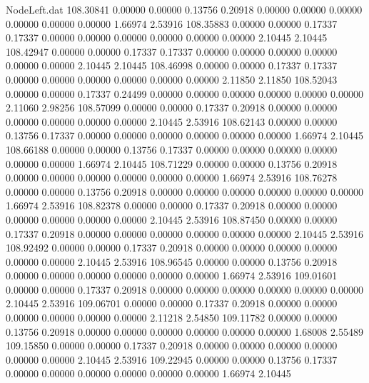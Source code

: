 \begin{filecontents}{NodeLeft.dat}
 108.30841    0.00000    0.00000     0.13756    0.20918    0.00000    0.00000    0.00000    0.00000    0.00000    0.00000    1.66974    2.53916
 108.35883    0.00000    0.00000     0.17337    0.17337    0.00000    0.00000    0.00000    0.00000    0.00000    0.00000    2.10445    2.10445
 108.42947    0.00000    0.00000     0.17337    0.17337    0.00000    0.00000    0.00000    0.00000    0.00000    0.00000    2.10445    2.10445
 108.46998    0.00000    0.00000     0.17337    0.17337    0.00000    0.00000    0.00000    0.00000    0.00000    0.00000    2.11850    2.11850
 108.52043    0.00000    0.00000     0.17337    0.24499    0.00000    0.00000    0.00000    0.00000    0.00000    0.00000    2.11060    2.98256
 108.57099    0.00000    0.00000     0.17337    0.20918    0.00000    0.00000    0.00000    0.00000    0.00000    0.00000    2.10445    2.53916
 108.62143    0.00000    0.00000     0.13756    0.17337    0.00000    0.00000    0.00000    0.00000    0.00000    0.00000    1.66974    2.10445
 108.66188    0.00000    0.00000     0.13756    0.17337    0.00000    0.00000    0.00000    0.00000    0.00000    0.00000    1.66974    2.10445
 108.71229    0.00000    0.00000     0.13756    0.20918    0.00000    0.00000    0.00000    0.00000    0.00000    0.00000    1.66974    2.53916
 108.76278    0.00000    0.00000     0.13756    0.20918    0.00000    0.00000    0.00000    0.00000    0.00000    0.00000    1.66974    2.53916
 108.82378    0.00000    0.00000     0.17337    0.20918    0.00000    0.00000    0.00000    0.00000    0.00000    0.00000    2.10445    2.53916
 108.87450    0.00000    0.00000     0.17337    0.20918    0.00000    0.00000    0.00000    0.00000    0.00000    0.00000    2.10445    2.53916
 108.92492    0.00000    0.00000     0.17337    0.20918    0.00000    0.00000    0.00000    0.00000    0.00000    0.00000    2.10445    2.53916
 108.96545    0.00000    0.00000     0.13756    0.20918    0.00000    0.00000    0.00000    0.00000    0.00000    0.00000    1.66974    2.53916
 109.01601    0.00000    0.00000     0.17337    0.20918    0.00000    0.00000    0.00000    0.00000    0.00000    0.00000    2.10445    2.53916
 109.06701    0.00000    0.00000     0.17337    0.20918    0.00000    0.00000    0.00000    0.00000    0.00000    0.00000    2.11218    2.54850
 109.11782    0.00000    0.00000     0.13756    0.20918    0.00000    0.00000    0.00000    0.00000    0.00000    0.00000    1.68008    2.55489
 109.15850    0.00000    0.00000     0.17337    0.20918    0.00000    0.00000    0.00000    0.00000    0.00000    0.00000    2.10445    2.53916
 109.22945    0.00000    0.00000     0.13756    0.17337    0.00000    0.00000    0.00000    0.00000    0.00000    0.00000    1.66974    2.10445

\end{filecontents}
